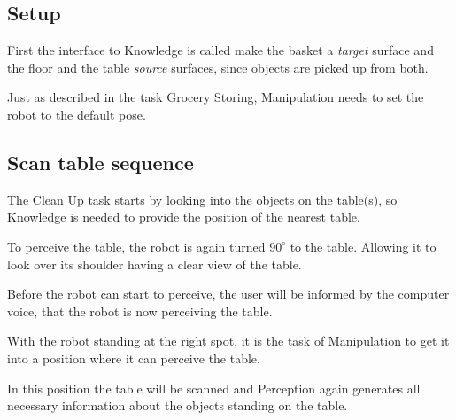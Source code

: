 \documentclass[main.tex]{subfiles}
\begin{document}
	\subsection{Setup}
	\begin{knowledge}	
	First the interface to Knowledge is called make the basket a \textit{target} surface and the floor and the table \textit{source} surfaces, since objects are picked up from both.
	\end{knowledge}
	
	\begin{manipulation}
	Just as described in the task Grocery Storing, Manipulation needs to set the robot to the default pose.
	\end{manipulation}

	\subsection{Scan table sequence}
	
	\begin{knowledge}
	The Clean Up task starts by looking into the objects on the table(s), so Knowledge is needed to provide the position of the nearest table.
	\end{knowledge}
	
	\begin{navigation}
	To perceive the table, the robot is again turned $90^\circ$ to the table. Allowing it to look over its shoulder having a clear view of the table.
	\end{navigation}
	
	\begin{nlp}
	Before the robot can start to perceive, the user will be informed by the computer voice, that the robot is now perceiving the table.
	\end{nlp}
	
	\begin{manipulation}
	With the robot standing at the right spot, it is the task of Manipulation to get it into a position where it can perceive the table.
   \end{manipulation} 
	
	\begin{perception}
	In this position the table will be scanned and Perception again generates all necessary information about the objects standing on the table.
	\end{perception}
	
\end{document}
